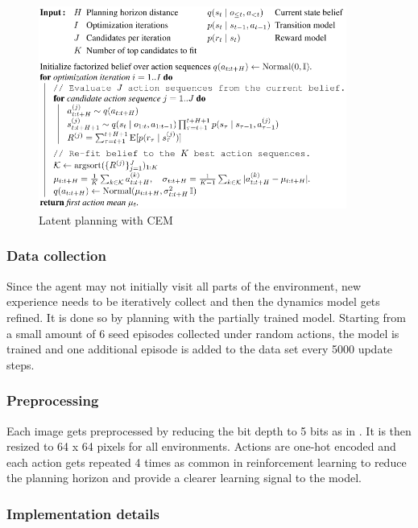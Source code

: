 \begin{figure}[H]
\includegraphics[width=0.9\textwidth,keepaspectratio]{figures/PlaNet/CEM.png}
\caption{Latent planning with CEM \cite{Algo.PlaNet}}
\label{Fig.CEMinPlaNet}
\end{figure}

\subsubsection{Data collection}

Since the agent may not initially visit all parts of the environment, new experience needs to be iteratively collect and then the dynamics model gets refined. It is done so by planning with the partially trained model. Starting from a small amount of 6 seed episodes collected under random actions, the model is trained and one additional episode is added to the data set every 5000 update steps.

\subsubsection{Preprocessing}

Each image gets preprocessed by reducing the bit depth to 5 bits as in \cite{Algo.Glow5bit}. It is then resized to 64 x 64 pixels for all environments.
Actions are one-hot encoded and each action gets repeated 4 times as common in reinforcement learning \cite{Algo.DQN} to reduce the planning horizon and provide a clearer learning signal to the model.

\subsubsection{Implementation details}

